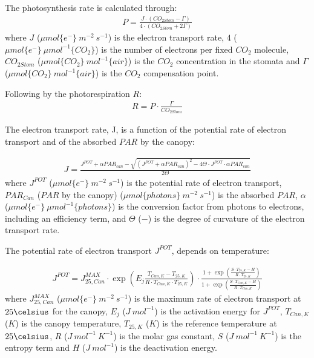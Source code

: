 \documentclass[a4paper]{article}
\numberwithin{equation}{section}
\begin{document}
The photosynthesis rate is calculated through:
\begin{align}
  P = \frac{J \cdot (CO_{2Stom} - \Gamma)}{4 \cdot (CO_{2Stom} + 2\Gamma)}
\end{align}
where \(J\) (\(\mu mol\{e^-\}\ m^{-2}\ s^{-1}\)) is the electron transport rate, \(4\) (\(\mu mol \{e^-\}\ \mu mol^{-1} \{CO_2\}\)) is the number of electrons per fixed \(CO_2\) molecule, \(CO_{2Stom}\) (\(\mu mol\{CO_2\}\ mol^{-1}\{air\}\)) is the \(CO_2\) concentration in the stomata and \(\Gamma\) (\(\mu mol \{CO_2\}\ mol^{-1} \{air\}\)) is the \(CO_2\) compensation point.

Following by the photorespiration \(R\):
\begin{align}
  R = P \cdot \frac{\Gamma}{CO_{2Stom}}
\end{align}

The electron transport rate, J, is a function of the potential rate of electron transport and of the absorbed \(PAR\) by the canopy:

\begin{align}
  J = \frac{J^{POT} + \alpha PAR_{can} - {\sqrt{{(J^{POT} + \alpha PAR_{can})}^2 - 4\Theta\cdot J^{POT}\cdot \alpha PAR_{can}}}}{2 \Theta}
\end{align}
where \(J^{POT}\) (\(\mu mol\{e^-\}\ m^{-2}\ s^{-1}\)) is the potential rate of electron transport, \(PAR_{Can}\) (\(PAR\) by the canopy) (\(\mu mol\{photons\}\ m^{-2}\ s^{-1}\)) is the absorbed \(PAR\), \(\alpha\) (\(\mu mol\{e^-\}\ \mu mol^{-1}\{photons\}\)) is the conversion factor from photons to electrons, including an efficiency term, and \(\Theta\) (\(-\)) is the degree of curvature of the electron transport rate.

The potential rate of electron transport \(J^{POT}\), depends on temperature:

\begin{align}
  J^{POT} = J^{MAX}_{25,Can} \cdot \exp \left(E_j\frac{T_{Can,K}-T_{25,K}}{R\cdot T_{Can,K}\cdot T_{25,K}}\right) \cdot \frac{1 + \exp \left(\frac{S\cdot T_{25,K}-H}{R\cdot T_{25,K}}\right)}{1 + \exp \left(\frac{S\cdot T_{Can,K}-H}{R\cdot T_{Can,K}}\right)}
\end{align}
where \(J^{MAX}_{25,Can}\) (\(\mu mol \{e^-\}\ m^{-2}\ s^{-1}\)) is the maximum rate of electron transport at \(25 \celsius\) for the canopy, \(E_j\) (\(J\ mol^{-1}\)) is the activation energy for \(J^{POT}\), \(T_{Can,K}\) (\(K\)) is the canopy temperature, \(T_{25,K}\) (\(K\)) is the reference temperature at \(25 \celsius\), \(R\) (\(J\ mol^{-1}\ K^{-1}\)) is the molar gas constant, \(S\) (\(J\ mol^{-1}\ K^{-1}\)) is the entropy term and \(H\) (\(J\ mol^{-1}\)) is the deactivation energy.
\end{document}
